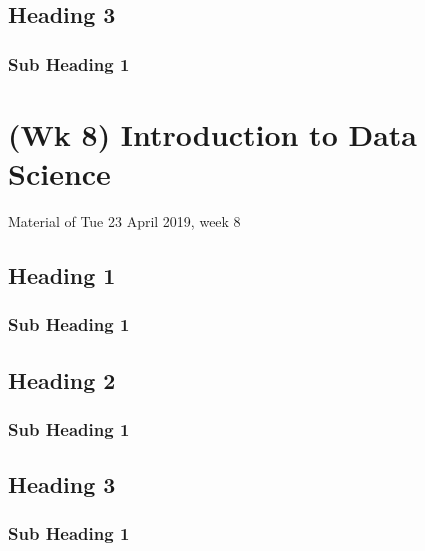 \documentclass[]{book}
\begin{document}
\hypertarget{heading-3-5}{%
\section{Heading 3}\label{heading-3-5}}

\hypertarget{sub-heading-1-17}{%
\subsection{Sub Heading 1}\label{sub-heading-1-17}}

\hypertarget{wk-8-introduction-to-data-science}{%
\chapter{(Wk 8) Introduction to Data Science}\label{wk-8-introduction-to-data-science}}

Material of Tue 23 April 2019, week 8

\hypertarget{heading-1-6}{%
\section{Heading 1}\label{heading-1-6}}

\hypertarget{sub-heading-1-18}{%
\subsection{Sub Heading 1}\label{sub-heading-1-18}}

\hypertarget{heading-2-6}{%
\section{Heading 2}\label{heading-2-6}}

\hypertarget{sub-heading-1-19}{%
\subsection{Sub Heading 1}\label{sub-heading-1-19}}

\hypertarget{heading-3-6}{%
\section{Heading 3}\label{heading-3-6}}

\hypertarget{sub-heading-1-20}{%
\subsection{Sub Heading 1}\label{sub-heading-1-20}}
\end{document}
